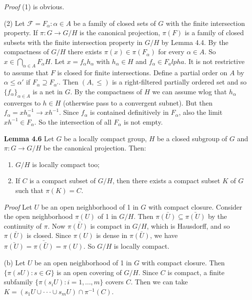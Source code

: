 \documentclass[12pt]{article}
\begin{document}
\emph{Proof} (1) is obvious.


    (2) Let $\mathcal{F} = {F_\alpha : \alpha \in A}$ be a family of closed sets of $G$ with the finite intersection property. If $\pi : G \to G/H$
is the canonical projection, $\pi(F)$ is a family of closed subsets with the finite intersection property in $G/H$ by
Lemma 4.4. By the compactness of $G/H$ there exists $\pi (x) \in \pi (F_\alpha)$ for every $\alpha \in A$. So $x \in \bigcap_{\alpha \in A} F_\alpha H$. Let
$x = f_\alpha h_\alpha$ with $h_\alpha \in H$ and $f_\alpha \in F_alpha$. It is not restrictive to assume that $F$ is closed for finite intersections.
Define a partial order on $A$ by $\alpha \leq \alpha'$ if $F_\alpha \supseteq F_{\alpha'} $. Then $(A, \leq)$ is a right-filtered partially ordered set and so
$\{f_\alpha\}_{\alpha \in A}$ is a net in $G$. By the compactness of $H$ we can assume wlog that $h_\alpha$ converges to $h \in H$ (otherwise
pass to a convergent subnet). But then $f_\alpha = xh^{-1}_\alpha \to xh^{-1}$. Since $f_\alpha$ is contained definitively in $F_\alpha$, also the
limit $xh^{-1} \in F_\alpha$. So the intersection of all $F_\alpha$ is not empty.


\textbf{Lemma 4.6} Let $G$ be a locally compact group, $H$ be a closed subgroup of $G$ and $\pi : G \to G/H$ be the canonical
projection. Then:


\begin{enumerate}

    \item $G/H$ is locally compact too;

    \item If $C$ is a compact subset of $G/H$, then there exists a compact subset $K$ of $G$ such that $\pi(K) = C.$

\end{enumerate}


\emph{Proof} Let $U$ be an open neighborhood of 1 in $G$ with compact closure. Consider the open neighborhood $\pi (U)$
of 1 in $G/H$. Then $\pi \bar{(U)} \subseteq \bar{\pi (U)}$ by the continuity of $\pi$. Now $\pi \bar{(U)}$ is compact in $G/H$, which is Hausdorff,
and so $\pi \bar{(U)}$ is closed. Since $\pi(U)$ is dense in $\pi \bar{(U)}$, we have $\bar{\pi (U)} = \bar{\pi \bar{(U)}} = \pi(U)$. So $G/H$ is locally compact.


    (b) Let $U$ be an open neighborhood of 1 in $G$ with compact closure. Then $\{\pi(sU) : s \in G\}$ is an open
covering of $G/H$. Since $C$ is compact, a finite subfamily $\{\pi (s_i U) : i = 1, . . . , m\}$ covers $C$. Then we can take
$K = (s_1 U \cup · · · \cup s_m U) \cap \pi^{-1} (C)$.
\end{document}
